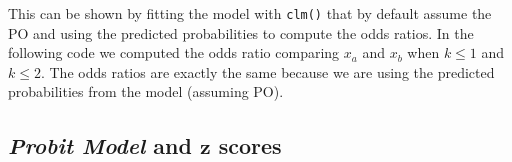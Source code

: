 \documentclass[
  man, mask,floatsintext]{apa6}
\newenvironment{Shaded}{\begin{snugshade}}{\end{snugshade}}
\newcommand{\AttributeTok}[1]{\textcolor[rgb]{0.13,0.29,0.53}{#1}}
\newcommand{\CommentTok}[1]{\textcolor[rgb]{0.56,0.35,0.01}{\textit{#1}}}
\newcommand{\DecValTok}[1]{\textcolor[rgb]{0.00,0.00,0.81}{#1}}
\newcommand{\FunctionTok}[1]{\textcolor[rgb]{0.13,0.29,0.53}{\textbf{#1}}}
\newcommand{\NormalTok}[1]{#1}
\newcommand{\OtherTok}[1]{\textcolor[rgb]{0.56,0.35,0.01}{#1}}
\newcommand{\SpecialCharTok}[1]{\textcolor[rgb]{0.81,0.36,0.00}{\textbf{#1}}}
\newcommand{\StringTok}[1]{\textcolor[rgb]{0.31,0.60,0.02}{#1}}
\begin{document}
This can be shown by fitting the model with \texttt{clm()} that by default assume the PO and using the predicted probabilities to compute the odds ratios. In the following code we computed the odds ratio comparing \(x_a\) and \(x_b\) when \(k \leq 1\) and \(k \leq 2\). The odds ratios are exactly the same because we are using the predicted probabilities from the model (assuming PO).

\scriptsize

\begin{Shaded}
\end{Shaded}

\normalsize

\subsection{\texorpdfstring{\emph{Probit Model} and \(\mathbf{z}\) scores}{Probit Model and \textbackslash mathbf\{z\} scores}}\label{probit-model-and-mathbfz-scores}
\end{document}
